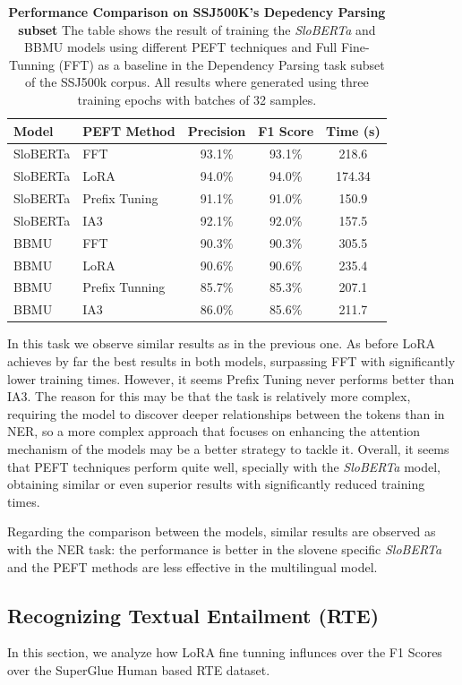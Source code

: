 \documentclass[fleqn,moreauthors,10pt]{ds_report}
\begin{document}
\begin{table}[ht]
\centering
\caption{\textbf{Performance Comparison on SSJ500K's Depedency Parsing subset} The table shows the result of training the {\it SloBERTa} and BBMU models using different PEFT techniques and Full Fine-Tunning (FFT) as a baseline in the Dependency Parsing task subset of the SSJ500k corpus. All results where generated using three training epochs with batches of 32 samples.}
\label{tab:dependency_parsing-results}
\small
\begin{tabular}{@{}llccc@{}}
\toprule
Model & PEFT Method & Precision & F1 Score & Time (s)\\ \midrule
SloBERTa & FFT & 93.1\% & 93.1\% & 218.6 \\
SloBERTa & LoRA & 94.0\% & 94.0\% & 174.34 \\
SloBERTa & Prefix Tuning & 91.1\% & 91.0\% & 150.9 \\
SloBERTa & IA3 & 92.1\% & 92.0\% & 157.5 \\
BBMU & FFT & 90.3\% & 90.3\% & 305.5 \\
BBMU & LoRA & 90.6\% & 90.6\% & 235.4 \\
BBMU & Prefix Tunning & 85.7\% & 85.3\% & 207.1 \\
BBMU & IA3 & 86.0\% & 85.6\% & 211.7 \\
\bottomrule
\end{tabular}
\end{table}

In this task we observe similar results as in the previous one. As before LoRA achieves by far the best results in both models, surpassing FFT with significantly lower training times. However, it seems Prefix Tuning never performs better than IA3. The reason for this may be that the task is relatively more complex, requiring the model to discover deeper relationships between the tokens than in NER, so a more complex approach that focuses on enhancing the attention mechanism of the models may be a better strategy to tackle it. Overall, it seems that PEFT techniques perform quite well, specially with the \textit{SloBERTa} model, obtaining similar or even superior results with significantly reduced training times.

Regarding the comparison between the models, similar results are observed as with the NER task: the performance is better in the slovene specific \textit{SloBERTa} and the PEFT methods are less effective in the multilingual model. 

\subsection{Recognizing Textual Entailment (RTE)}
In this section, we analyze how LoRA fine tunning influnces over the F1 Scores over the SuperGlue Human based RTE dataset. 
\end{document}

